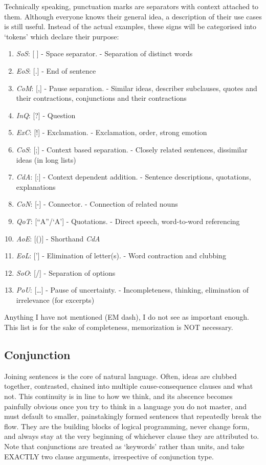 Technically speaking, punctuation marks are separators with context attached to them. Although everyone knows their general idea, a description of their use cases is still  useful. Instead of the actual examples, these signs will be categorised into `tokens' which declare their purpose:
\begin{enumerate}
    \item \textit{SoS}: [ ] - Space separator.  - Separation of distinct words
    \item \textit{EoS}: [.] - End of  sentence
    \item \textit{CoM}: [,] - Pause separation.  - Similar ideas, describer subclauses, quotes and their contractions, conjunctions and their contractions
    \item \textit{InQ}: [?] - Question
    \item \textit{ExC}: [!] - Exclamation.  - Exclamation, order, strong emotion
    \item \textit{CoS}: [;] - Context based separation.  - Closely related sentences, dissimilar ideas (in long lists)
    \item \textit{CdA}: [:] - Context dependent addition.  - Sentence descriptions, quotations, explanations
    \item \textit{CoN}: [-] - Connector.  - Connection of related nouns 
    \item \textit{QoT}: [``A''/`A'] - Quotations.  - Direct speech, word-to-word referencing
    \item \textit{AoE}: [()] - Shorthand \textit{CdA}
    \item \textit{EoL}: ['] - Elimination of letter(s).  - Word contraction and clubbing
    \item \textit{SoO}: [/] - Separation of options
    \item \textit{PoU}: [\ldots] - Pause of uncertainty.  - Incompleteness, thinking, elimination of irrelevance (for excerpts)
\end{enumerate}
Anything I have not mentioned (EM dash), I do not see as important enough. This list is for the sake of completeness, memorization is NOT necessary.
\subsection{Conjunction}
Joining sentences is the core of natural language. Often, ideas are clubbed together, contrasted, chained into multiple cause-consequence clauses and what not. This continuity is in line to how we think, and its abscence becomes painfully obvious once you try to think in a language you do not master, and must default to smaller, painstakingly formed sentences that repeatedly break the flow. They are the building blocks of logical programming, never change form, and always stay at the very beginning of whichever clause they are attributed to. Note that conjunctions are treated as `keywords' rather than units, and take EXACTLY two clause arguments, irrespective of conjunction type.

